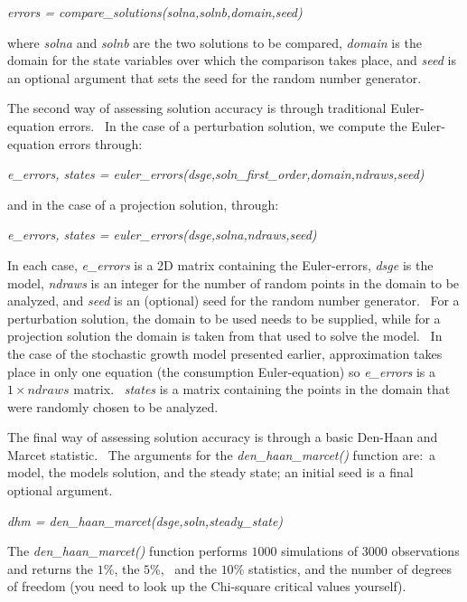 \documentclass[notitlepage,11pt]{article}
\begin{document}
\bigskip

\textit{errors = compare\_solutions(solna,solnb,domain,seed)}

\bigskip

where \textit{solna} and \textit{solnb} are the two solutions to be
compared, \textit{domain} is the domain for the state variables over which
the comparison takes place, and \textit{seed} is an optional argument that
sets the seed for the random number generator.

The second way of assessing solution accuracy is through traditional
Euler-equation errors. \ In the case of a perturbation solution, we compute
the Euler-equation errors through:

\bigskip

\textit{e\_errors, states =
euler\_errors(dsge,soln\_first\_order,domain,ndraws,seed)}

\bigskip

and in the case of a projection solution, through:

\bigskip

\textit{e\_errors, states = euler\_errors(dsge,solna,ndraws,seed)}

\bigskip

In each case, \textit{e\_errors} is a 2D matrix containing the Euler-errors, 
\textit{dsge} is the model, \textit{ndraws} is an integer for the number of
random points in the domain to be analyzed, and \textit{seed} is an
(optional) seed for the random number generator. \ For a perturbation
solution, the domain to be used needs to be supplied, while for a projection
solution the domain is taken from that used to solve the model. \ In the
case of the stochastic growth model presented earlier, approximation takes
place in only one equation (the consumption Euler-equation) so \textit{%
e\_errors} is a $1\times ndraws$ matrix. \ \textit{states} is a matrix
containing the points in the domain that were randomly chosen to be analyzed.

The final way of assessing solution accuracy is through a basic Den-Haan and
Marcet statistic. \ The arguments for the \textit{den\_haan\_marcet()}
function are:\ a model, the models solution, and the steady state; an
initial seed is a final optional argument.

\bigskip

\textit{dhm = den\_haan\_marcet(dsge,soln,steady\_state)}

\bigskip

The \textit{den\_haan\_marcet()} function performs $1000$ simulations of $%
3000$ observations and returns the $1$\%, the $5$\%, \ and the $10$\%
statistics, and the number of degrees of freedom (you need to look up the
Chi-square critical values yourself).
\end{document}
